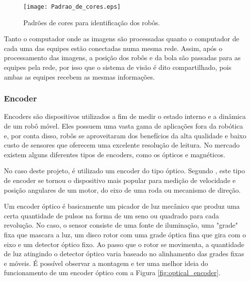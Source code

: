 \documentclass[acronym, symbols]{fei}
\begin{document}
				\begin{figure}[!htb]
					\centering
					\caption{Padrões de cores para identificação dos robôs.} 
					\texttt{[image: Padrao\_de\_cores.eps]}
					\label{fig:color_patterns}
				\end{figure}
			
				Tanto o computador onde as imagens são processadas quanto o computador de cada uma das equipes estão conectadas numa mesma rede. Assim, após o processamento das imagens, a posição dos robôs e da bola são passadas para as equipes pela rede, por isso que o sistema de visão é dito compartilhado, pois ambas as equipes recebem as mesmas informações.
			
			\subsubsection{Encoder}
				
				Encoders são dispositivos utilizados a fim de medir o estado interno e a dinâmica de um robô móvel. Eles possuem uma vasta gama de aplicações fora da robótica e, por conta disso, robôs se aproveitaram dos benefícios da alta qualidade e baixo custo de sensores que oferecem uma excelente resolução de leitura. No mercado existem alguns diferentes tipos de encoders, como os ópticos e magnéticos. 
				
				No caso deste projeto, é utilizado um encoder do tipo óptico. Segundo \textcite{siegwart2011introduction}, este tipo de encoder se tornou o dispositivo mais popular para medição de velocidade e posição angulares de um motor, do eixo de uma roda ou mecanismo de direção.
				
				Um encoder óptico é basicamente um picador de luz mecânico que produz uma certa quantidade de pulsos na forma de um seno ou quadrado para cada revolução. No caso, o sensor consiste de uma fonte de iluminação, uma "grade" fixa que mascara a luz, um disco rotor com uma grade óptica fina que gira com o eixo e um detector óptico fixo. Ao passo que o rotor se movimenta, a quantidade de luz atingindo o detector óptico varia baseado no alinhamento das grades fixas e móveis. É possível observar a montagem e ter uma melhor ideia do funcionamento de um encoder óptico com a Figura \ref{fig:optical_encoder}.
				
\end{document}
